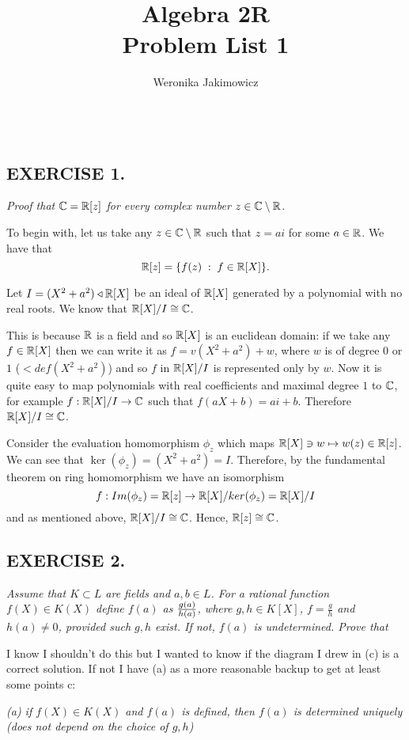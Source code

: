 \documentclass{article}
\title{\large Algebra 2R\smallskip\\ \textbf{Problem List 1}}
\author{\normalsize Weronika Jakimowicz}
\date{~~~}
\begin{document}
\maketitle
\thispagestyle{empty}

\subsection*{EXERCISE 1.}
\emph{Proof that $\mathbb{C}=\mathbb{R}[z]$ for every complex number $z\in \mathbb{C}\setminus\mathbb{R}$.}
\bigskip

To begin with, let us take any $z\in\mathbb{C}\setminus\mathbb{R}$ such that $z=ai$ for some $a\in\mathbb{R}$. We have that
$$\mathbb{R}[z]=\{f(z)\;:\;f\in\mathbb{R}[X]\}.$$

Let $I=(X^2+a^2)\triangleleft\mathbb{R}[X]$ be an ideal of $\mathbb{R}[X]$ generated by a polynomial with no real roots. We know that $\mathbb{R}[X]/I\cong \mathbb{C}$. 

This is because $\mathbb{R}$ is a field and so $\mathbb{R}[X]$ is an euclidean domain: if we take any $f\in\mathbb{R}[X]$ then we can write it as $f=v(X^2+a^2)+w$, where $w$ is of degree $0$ or $1$ ($<def(X^2+a^2)$) and so $f$ in $\mathbb{R}[X]/I$ is represented only by $w$. Now it is quite easy to map polynomials with real coefficients and maximal degree $1$ to $\mathbb{C}$, for example $f:\mathbb{R}[X]/I\to\mathbb{C}$ such that $f(aX+b)=ai+b$. Therefore $\mathbb{R}[X]/I\cong \mathbb{C}$.

Consider the evaluation homomorphism $\phi_z$ which maps $\mathbb{R}[X]\ni w\mapsto w(z)\in\mathbb{R}[z]$. We can see that $\ker(\phi_z)=(X^2+a^2)=I$. Therefore, by the fundamental theorem on ring homomorphism we have an isomorphism
$$f:Im(\phi_z)=\mathbb{R}[z]\to \mathbb{R}[X]/ker(\phi_z)=\mathbb{R}[X]/I$$
and as mentioned above, $\mathbb{R}[X]/I\cong\mathbb{C}$. Hence, $\mathbb{R}[z]\cong\mathbb{C}$.

\subsection*{EXERCISE 2.}
\emph{Assume that $K\subset L$ are fields and $a,b\in L$. For a rational function $f(X)\in K(X)$ define $f(a)$ as ${g(a)\over h(a)}$, where $g,h\in K[X]$, $f=\frac gh$ and $h(a)\neq 0$, provided such $g,h$ exist. If not, $f(a)$ is undetermined. Prove that}

\begin{center}
    {\color{red}I know I shouldn't do this but I wanted to know if the diagram I drew in (c) is a correct solution. If not I have (a) as a more reasonable backup to get at least some points c:}
\end{center}

\emph{(a) if $f(X)\in K(X)$ and $f(a)$ is defined, then $f(a)$ is determined uniquely (does not depend on the choice of $g, h$)}
\bigskip
\end{document}
